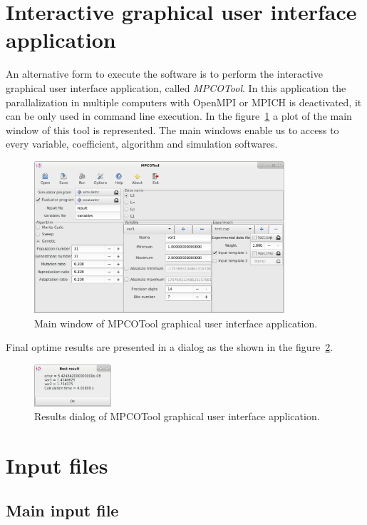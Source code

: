 \documentclass[a4paper]{report}
\begin{document}
\section{Interactive graphical user interface application}

An alternative form to execute the software is to perform the interactive
graphical user interface application, called \emph{MPCOTool}. In this
application the parallalization in multiple computers with OpenMPI or MPICH is
deactivated, it can be only used in command line execution. In the
figure~\ref{FigWindow} a plot of the main window of this tool is represented.
The main windows enable us to access to every variable, coefficient, algorithm
and simulation softwares.
\begin{figure}[ht!]
	\centering
	\includegraphics[width=9.30cm]{mpcotool-en.eps}
	\caption{Main window of MPCOTool graphical user interface application.
		\label{FigWindow}}
\end{figure}

Final optime results are presented in a dialog as the shown in the
figure~\ref{FigResult}.
\begin{figure}[ht!]
	\centering
	\includegraphics[width=2.87cm]{result-en.eps}
	\caption{Results dialog of MPCOTool graphical user interface application.
		\label{FigResult}}
\end{figure}

\section{Input files}

\subsection{Main input file}
\end{document}
